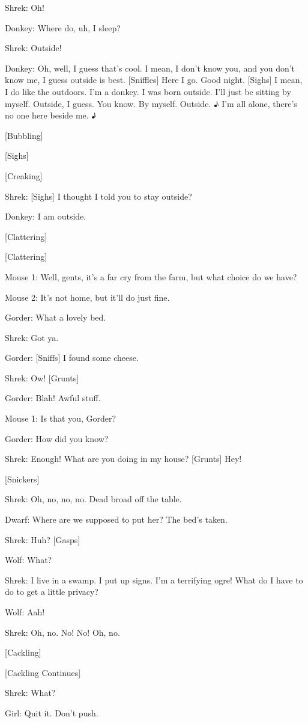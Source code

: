 \documentclass{article}
\begin{document}
Shrek:
Oh!

Donkey:
Where do, uh, I sleep?

Shrek:
Outside!

Donkey:
Oh, well, I guess that's cool. I mean, I don't know you, and you don't know me, I guess outside is best. [Sniffles] Here I go. Good night. [Sighs] I mean, I do like the outdoors. I'm a donkey. I was born outside. I'll just be sitting by myself. Outside, I guess. You know. By myself. Outside. ♪ I'm all alone, there's no one here beside me. ♪

[Bubbling]

[Sighs]

[Creaking]

Shrek:
[Sighs] I thought I told you to stay outside?

Donkey:
I am outside.

[Clattering]

[Clattering]

Mouse 1:
Well, gents, it's a far cry from the farm, but what choice do we have?

Mouse 2:
It's not home, but it'll do just fine.

Gorder:
What a lovely bed.

Shrek:
Got ya.

Gorder:
[Sniffs] I found some cheese.

Shrek:
Ow! [Grunts]

Gorder:
Blah! Awful stuff.

Mouse 1:
Is that you, Gorder?

Gorder:
How did you know?

Shrek:
Enough! What are you doing in my house? [Grunts] Hey!

[Snickers]

Shrek:
Oh, no, no, no. Dead broad off the table.

Dwarf:
Where are we supposed to put her? The bed's taken.

Shrek:
Huh? [Gasps]

Wolf:
What?

Shrek:
I live in a swamp. I put up signs. I'm a terrifying ogre! What do I have to do to get a little privacy?

Wolf:
Aah!

Shrek:
Oh, no. No! No! Oh, no.

[Cackling]

[Cackling Continues]

Shrek:
What?

Girl:
Quit it. Don't push.
\end{document}
